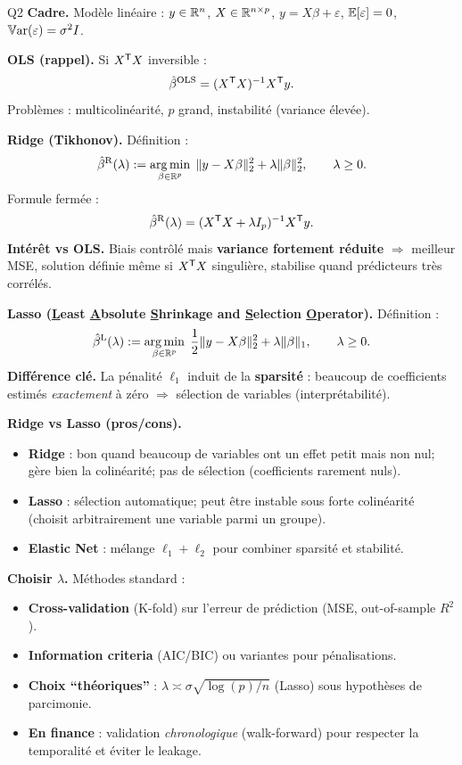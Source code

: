 \begin{solutionbox}{Q2}
\textbf{Cadre.} Modèle linéaire : $y\in\mathbb{R}^n$, $X\in\mathbb{R}^{n\times p}$, $y=X\beta+\varepsilon$, $\mathbb{E}[\varepsilon]=0$, $\mathbb{V}\mathrm{ar}(\varepsilon)=\sigma^2 I$.

\medskip
\textbf{OLS (rappel).} Si $X^{\mathsf{T}} X$ inversible :
\[
\hat\beta^{\mathrm{OLS}}=(X^{\mathsf{T}} X)^{-1}X^{\mathsf{T}} y.
\]
Problèmes : multicolinéarité, $p$ grand, instabilité (variance élevée).

\medskip
\textbf{Ridge (Tikhonov).} Définition :
\[
\hat\beta^{\mathrm{R}}(\lambda) := \mathop{\mathrm{arg\,min}}_{\beta\in\mathbb{R}^p}\;\|y-X\beta\|_2^2 + \lambda \|\beta\|_2^2,\qquad \lambda\ge 0.
\]
Formule fermée :
\[
\hat\beta^{\mathrm{R}}(\lambda) = (X^{\mathsf{T}} X + \lambda I_p)^{-1} X^{\mathsf{T}} y.
\]
\textbf{Intérêt vs OLS.} Biais contrôlé mais \textbf{variance fortement réduite} $\Rightarrow$ meilleur MSE, solution définie même si $X^{\mathsf{T}} X$ singulière, stabilise quand prédicteurs très corrélés.

\medskip
\textbf{Lasso (\underline{L}east \underline{A}bsolute \underline{S}hrinkage and \underline{S}election \underline{O}perator).} Définition :
\[
\hat\beta^{\mathrm{L}}(\lambda) := \mathop{\mathrm{arg\,min}}_{\beta\in\mathbb{R}^p}\;\frac12\|y-X\beta\|_2^2 + \lambda \|\beta\|_1,\qquad \lambda\ge 0.
\]
\textbf{Différence clé.} La pénalité $\ell_1$ induit de la \textbf{sparsité} : beaucoup de coefficients estimés \emph{exactement} à zéro $\Rightarrow$ sélection de variables (interprétabilité).

\medskip
\textbf{Ridge vs Lasso (pros/cons).}
\begin{itemize}[leftmargin=*]
  \item \textbf{Ridge} : bon quand beaucoup de variables ont un effet petit mais non nul; gère bien la colinéarité; pas de sélection (coefficients rarement nuls).
  \item \textbf{Lasso} : sélection automatique; peut être instable sous forte colinéarité (choisit arbitrairement une variable parmi un groupe).
  \item \textbf{Elastic Net} : mélange $\ell_1+\ell_2$ pour combiner sparsité et stabilité.
\end{itemize}

\medskip
\textbf{Choisir $\lambda$.} Méthodes standard :
\begin{itemize}[leftmargin=*]
  \item \textbf{Cross-validation} (K-fold) sur l'erreur de prédiction (MSE, out-of-sample $R^2$).
  \item \textbf{Information criteria} (AIC/BIC) ou variantes pour pénalisations.
  \item \textbf{Choix ``théoriques''} : $\lambda \asymp \sigma\sqrt{\log(p)/n}$ (Lasso) sous hypothèses de parcimonie.
  \item \textbf{En finance} : validation \emph{chronologique} (walk-forward) pour respecter la temporalité et éviter le leakage.
\end{itemize}


\end{solutionbox}
